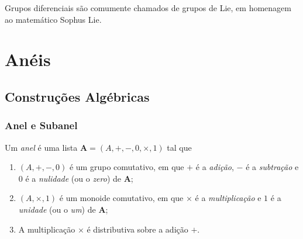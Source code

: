 Grupos diferenciais são comumente chamados de grupos de Lie, em homenagem ao matemático Sophus Lie.



\cleardoublepage
\chapter{Anéis}

\section{Construções Algébricas}

\subsection{Anel e Subanel}

\begin{defi}
Um \emph{anel} é uma lista $\bm A=(A,+,-,0,\times,1)$ tal que
	\begin{enumerate}
	\item $(A,+,-,0)$ é um grupo comutativo, em que $+$ é a \emph{adição}, $-$ é a \emph{subtração} e $0$ é a \emph{nulidade} (ou o \emph{zero}) de $\bm A$;
	\item $(A,\times,1)$ é um monoide comutativo, em que $\times$ é a \emph{multiplicação} e $1$ é a \emph{unidade} (ou o \emph{um}) de $\bm A$;
	\item A multiplicação $\times$ é distributiva sobre a adição $+$.
	\end{enumerate}
\end{defi}


